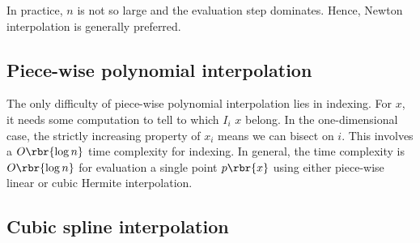 \documentclass[english, nochinese]{pnote}
\begin{document}
In practice, $n$ is not so large and the evaluation step dominates. Hence, Newton interpolation is generally preferred.

\subsection{Piece-wise polynomial interpolation}

The only difficulty of piece-wise polynomial interpolation lies in indexing. For $x$, it needs some computation to tell to which $I_i$ $x$ belong. In the one-dimensional case, the strictly increasing property of $x_i$ means we can bisect on $i$. This involves a $ O \rbr{ \log n } $ time complexity for indexing. In general, the time complexity is $ O \rbr{ \log n } $ for evaluation a single point $ p \rbr{x} $ using either piece-wise linear or cubic Hermite interpolation.

\subsection{Cubic spline interpolation}
\end{document}
